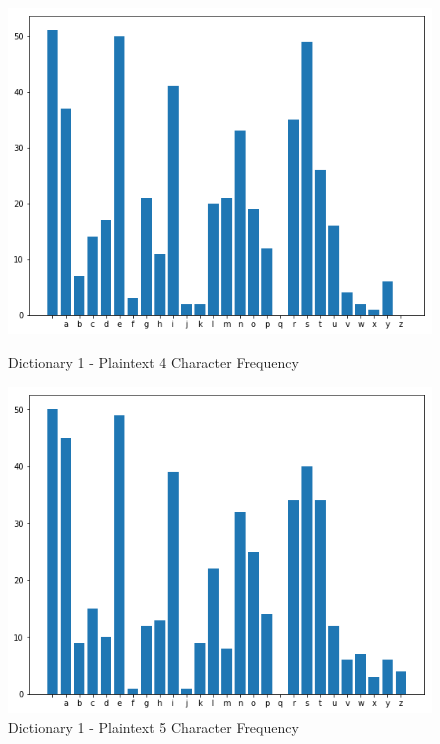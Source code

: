 \documentclass[12pt]{article}
\begin{document}
\begin{figure}[H]
    \centering
    \includegraphics[scale=0.5]{pt4.png}
    \caption{Dictionary 1 - Plaintext 4 Character Frequency}
    \label{fig:pt4}

    \centering
    \includegraphics[scale=0.5]{pt5.png}
    \caption{Dictionary 1 - Plaintext 5 Character Frequency}
    \label{fig:pt5}


\end{figure}
\end{document}
